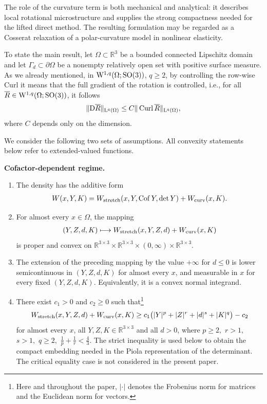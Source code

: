 \documentclass[11pt]{article}
\begin{document}
 The role of the curvature term is both mechanical and analytical: it describes local rotational microstructure and supplies the strong compactness needed for the lifted direct method. The resulting formulation may be regarded as a Cosserat relaxation of a polar-curvature model in nonlinear elasticity. 



To state the main result, let $\Omega\subset\mathbb R^3$ be a bounded connected Lipschitz domain and let $\Gamma_d\subset\partial\Omega$ be a nonempty relatively open set with positive surface measure. As we already mentioned, in  $
{\rm W}^{1,q}(\Omega;{\rm SO}(3))
$,  \(q\geq 2\), by controlling the row-wise Curl it means that the full gradient of the rotation is controlled, i.e., for all $\overline R\in {\rm W}^{1,q}(\Omega;{\rm SO}(3))$, it follows \begin{align}\label{lem:rotation-curl-control}
\|{\rm D} \overline R\|_{{\rm L}^q(\Omega)}
\leq
C\|\operatorname{Curl}\overline R\|_{{\rm L}^q(\Omega)},
\end{align}
where $C$ depends only on the dimension. 

We consider the following two sets of assumptions. All convexity statements below refer to extended-valued functions.

\medskip
\noindent\textbf{Cofactor-dependent regime.}
\begin{enumerate}
\item[H1)] The density has the additive form
\begin{align}
W(x,Y,K)
=
W_{\rm stretch}(x,Y,\operatorname{Cof}Y,\det Y)
+
W_{\rm curv}(x,K).
\end{align}

\item[H2)] For almost every $x\in\Omega$, the mapping
\begin{align}
(Y,Z,d,K)
\longmapsto
W_{\rm stretch}(x,Y,Z,d)+W_{\rm curv}(x,K)
\end{align}
is proper and convex on
$
\mathbb R^{3\times3}\times\mathbb R^{3\times3}\times(0,\infty)\times\mathbb R^{3\times3}.
$

\item[H3)] The extension of the preceding mapping by the value $+\infty$ for $d\leq0$ is lower semicontinuous in $(Y,Z,d,K)$ for almost every $x$, and measurable in $x$ for every fixed $(Y,Z,d,K)$. Equivalently, it is a convex normal integrand.

\item[H4)] There exist $c_1>0$ and $c_2\geq0$ such that\footnote{Here and throughout the paper, $|\cdot|$ denotes the Frobenius norm for matrices and the Euclidean norm for vectors.}
\begin{align}
W_{\rm stretch}(x,Y,Z,d)+W_{\rm curv}(x,K)
\geq
c_1\bigl(|Y|^p+|Z|^r+|d|^s+|K|^q\bigr)-c_2
\end{align}
for almost every $x$, all $Y,Z,K\in\mathbb R^{3\times3}$ and all $d>0$, where
$
p\geq2,$ $ r>1,$ $s>1,$ $ q\geq 2,
$  $
\frac1p+\frac1r<\frac43.
$
The strict inequality is used below to obtain the compact embedding
needed in the Piola representation of the determinant. The critical
equality case is not considered in the present paper.
\end{enumerate}
\end{document}
